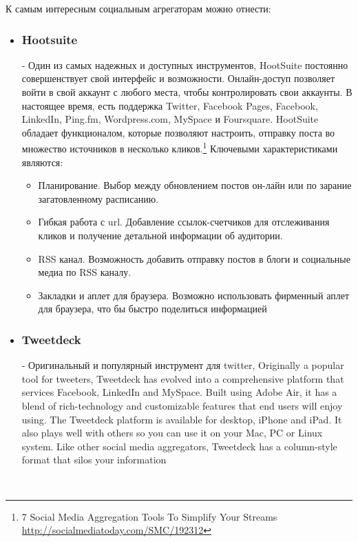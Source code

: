 \begin{chap1}
К самым интересным социальным агрегаторам можно отнести:
\begin{itemize}
\item \subsubsection{Hootsuite} - Один из самых надежных и доступных инструментов,  HootSuite постоянно совершенствует свой интерфейс и возможности. Онлайн-доступ позволяет войти в свой аккаунт с любого места, чтобы контролировать свои аккаунты. В настоящее время, есть поддержка Twitter, Facebook Pages, Facebook, LinkedIn, Ping.fm, Wordpress.com, MySpace и Foursquare. HootSuite обладает функционалом, которые позволяют настроить, отправку поста во множество источников в несколько кликов.\footnote{7 Social Media Aggregation Tools To Simplify Your Streams  \url{http://socialmediatoday.com/SMC/192312}} Ключевыми характеристиками являются:
	\begin{itemize}
	\item  Планирование. Выбор между обновлением постов он-лайн или по зарание загатовленному расписанию.
	\item Гибкая работа с url. Добавление ссылок-счетчиков для отслеживания кликов и получение детальной информации об аудитории.
	\item  RSS канал. Возможность добавить отправку постов в блоги и социальные медиа по RSS каналу.
	\item Закладки и аплет для браузера. Возможно использовать фирменный аплет для браузера, что бы быстро поделиться информацией
	\end{itemize}

\item \subsubsection{Tweetdeck} - Оригинальный  и популярный инструмент для  twitter,
 Originally a popular tool for tweeters, Tweetdeck has evolved into a comprehensive platform that services Facebook, LinkedIn and MySpace. Built using Adobe Air, it has a blend of rich-technology and customizable features that end users will enjoy using. The Tweetdeck platform is available for desktop, iPhone and iPad. It also plays well with others so you can use it on your Mac, PC or Linux system. Like other social media aggregators, Tweetdeck has a column-style format that silos your information
\end{itemize}
\


\end{chap1}
